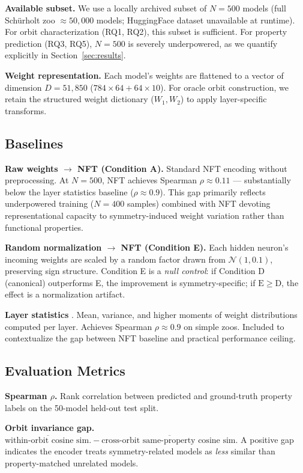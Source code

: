 \textbf{Available subset.} We use a locally archived subset of $N=500$ models (full Schürholt zoo $\approx 50{,}000$ models; HuggingFace dataset unavailable at runtime). For orbit characterization (RQ1, RQ2), this subset is sufficient. For property prediction (RQ3, RQ5), $N=500$ is severely underpowered, as we quantify explicitly in Section~\ref{sec:results}.

\textbf{Weight representation.} Each model's weights are flattened to a vector of dimension $D=51{,}850$ ($784 \times 64 + 64 \times 10$). For oracle orbit construction, we retain the structured weight dictionary ($W_1, W_2$) to apply layer-specific transforms.

\subsection{Baselines}

\textbf{Raw weights $\to$ NFT (Condition A).} Standard NFT encoding without preprocessing. At $N=500$, NFT achieves Spearman $\rho \approx 0.11$ --- substantially below the layer statistics baseline ($\rho \approx 0.9$). This gap primarily reflects underpowered training ($N=400$ samples) combined with NFT devoting representational capacity to symmetry-induced weight variation rather than functional properties.

\textbf{Random normalization $\to$ NFT (Condition E).} Each hidden neuron's incoming weights are scaled by a random factor drawn from $\mathcal{N}(1, 0.1)$, preserving sign structure. Condition E is a \textit{null control}: if Condition D (canonical) outperforms E, the improvement is symmetry-specific; if $\mathrm{E} \geq \mathrm{D}$, the effect is a normalization artifact.

\textbf{Layer statistics} \citep{Unterthiner2020PredictingNN}. Mean, variance, and higher moments of weight distributions computed per layer. Achieves Spearman $\rho \approx 0.9$ on simple zoos. Included to contextualize the gap between NFT baseline and practical performance ceiling.

\subsection{Evaluation Metrics}

\textbf{Spearman $\rho$.} Rank correlation between predicted and ground-truth property labels on the 50-model held-out test split.

\textbf{Orbit invariance gap.} $\overline{\text{within-orbit cosine sim.}} - \overline{\text{cross-orbit same-property cosine sim.}}$ A positive gap indicates the encoder treats symmetry-related models as \textit{less} similar than property-matched unrelated models.

